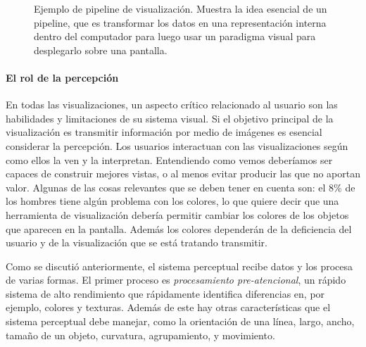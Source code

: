 \documentclass[12pt]{article}
\begin{document}
\begin{figure}[h] %
\caption[Pipeline de visualización]{Ejemplo de pipeline de visualización. Muestra la idea esencial de un pipeline, que es transformar los datos en una representación interna dentro del computador para luego usar un paradigma visual para desplegarlo sobre una pantalla.}
\label{fig:pipeline_visualizacion}
\end{figure}




\paragraph{El rol de la percepción}

En todas las visualizaciones, un aspecto crítico relacionado al usuario son las habilidades y limitaciones de su sistema visual. Si el objetivo principal de la visualización es transmitir información por medio de imágenes es esencial considerar la percepción. Los usuarios interactuan con las visualizaciones según como ellos la ven y la interpretan. Entendiendo como vemos deberíamos ser capaces de construir mejores vistas, o al menos evitar producir las que no aportan valor. Algunas de las cosas relevantes que se deben tener en cuenta son: el 8\% de los hombres tiene algún problema con los colores, lo que quiere decir que una herramienta de visualización debería permitir cambiar los colores de los objetos que aparecen en la pantalla. Además los colores dependerán de la deficiencia del usuario y de la visualización que se está tratando transmitir.


Como se discutió anteriormente, el sistema perceptual recibe datos y los procesa de varias formas. El primer proceso es \textit{procesamiento pre-atencional}, un rápido sistema de alto rendimiento que rápidamente identifica diferencias en, por ejemplo, colores y texturas. Además de este hay otras características que el sistema perceptual debe manejar, como la orientación de una línea, largo, ancho, tamaño de un objeto, curvatura, agrupamiento, y movimiento.
\end{document}
